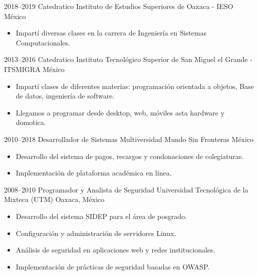 \cventry
{2018--2019}
{Catedratico}
{Instituto de Estudios Superiores de Oaxaca - IESO}
{México}
{}
{
\begin{itemize}
  \item Impartí diversas clases en la carrera de Ingeniería en Sistemas Computacionales.
\end{itemize}
}

\cventry
{2013--2016}
{Catedratico}
{Instituto Tecnológico Superior de San Miguel el Grande - ITSMIGRA}
{México}
{}
{
\begin{itemize}
  \item Impartí clases de diferentes materias: programación orientada a objetos, Base de datos, ingeniería de software.
  \item Llegamos a programar desde desktop, web, móviles asta hardware y domotica.
\end{itemize}
}


\cventry
{2010--2018}
{Desarrollador de Sistemas}
{Multiversidad Mundo Sin Fronteras}
{México}
{}
{
\begin{itemize}
  \item Desarrollo del sistema de pagos, recargos y condonaciones de colegiaturas.
  \item Implementación de plataforma académica en línea.
\end{itemize}
}


\cventry
{2008--2010}
{Programador y Analista de Seguridad}
{Universidad Tecnológica de la Mixteca (UTM)}
{Oaxaca, México}
{}
{
\begin{itemize}
  \item Desarrollo del sistema SIDEP para el área de posgrado.
  \item Configuración y administración de servidores Linux.
  \item Análisis de seguridad en aplicaciones web y redes institucionales.
  \item Implementación de prácticas de seguridad basadas en OWASP.
\end{itemize}
}

